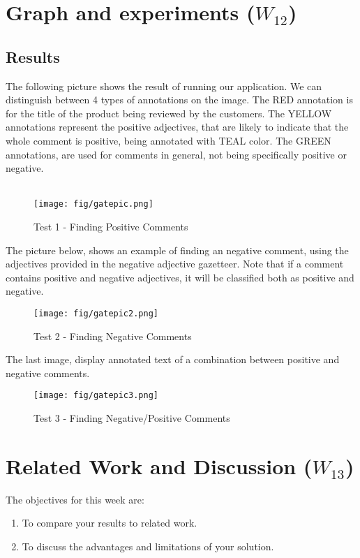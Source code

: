 \documentclass[a4paper,12pt]{report}
\begin{document}


\chapter{Graph and experiments ($W_{12}$)}
\section{Results}

The following picture shows the result of running our application. We can distinguish between 4 types of annotations on the image. The RED annotation is for the title of the product
being reviewed by the customers. The YELLOW annotations represent the positive adjectives, that are likely to indicate that the whole comment is positive, being annotated with TEAL color. The GREEN annotations, are used for comments
in general, not being specifically positive or negative.\\\\
\begin{figure}[H]
 \texttt{[image: fig/gatepic.png]}
  \caption{Test 1 - Finding Positive Comments}
\end{figure}



The picture below, shows an example of finding an negative comment, using the adjectives provided in the negative adjective gazetteer. Note that if a comment contains positive and negative adjectives, it will be classified both as positive and negative.
\begin{figure}[H]
 \texttt{[image: fig/gatepic2.png]}
  \caption{Test 2 - Finding Negative Comments}
\end{figure}


The last image, display annotated text of a combination between positive and negative comments.
\begin{figure}[H]
 \texttt{[image: fig/gatepic3.png]}
  \caption{Test 3 - Finding Negative/Positive Comments}
\end{figure}


\chapter{Related Work and Discussion ($W_{13}$)}
The objectives for this week are:
\begin{enumerate}
 \item To compare your results to related work.
\item To discuss the advantages and limitations of your solution.
\end{enumerate}
\end{document}
